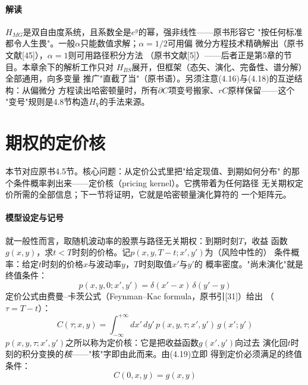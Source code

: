 \paragraph{解读}
$H_{MG}$是双自由度系统，且系数全是$e^{y}$的幂，强非线性——原书形容它
"按任何标准都令人生畏"。一般$\alpha$只能数值求解；$\alpha=1/2$可用偏
微分方程技术精确解出（原书文献[45]），$\alpha=1$则可用路径积分方法
（原书文献[5]）——后者正是第5章的节目。本章余下的解析工作只对
$H_{BS}$展开，但框架（态矢、演化、完备性、谱分解）全部通用，向多变量
推广"直截了当"（原书语）。另须注意(4.16)与(4.18)的互逆结构：从偏微分
方程读出哈密顿量时，所有$\partial C$项变号搬家、$rC$原样保留——这个
"变号"规则是4.8节构造$H_{V}$的手法来源。

\section{期权的定价核}

本节对应原书4.5节。核心问题：从定价公式里把"给定现值、到期如何分布"
的那个条件概率剥出来——定价核（pricing kernel）。它携带着为任何路径
无关期权定价所需的全部信息；下一节将证明，它就是哈密顿量演化算符的
一个矩阵元。

\paragraph{模型设定与记号}
就一般性而言，取随机波动率的股票与路径无关期权：到期时刻$T$，收益
函数$g(x,y)$，求$t<T$时刻的价格。记$p(x,y,T-t;x',y')$为（风险中性的）
条件概率：给定$t$时刻的价格$x$与波动率$y$，$T$时刻取值$x'$与$y'$的
概率密度。"尚未演化"就是终值条件：
\begin{equation*}
p(x,y,0;x',y')=\delta(x'-x)\,\delta(y'-y)
\tag{4.19}
\end{equation*}
定价公式由费曼--卡茨公式（Feynman--Kac formula，原书引[31]）给出
（$\tau=T-t$）：
\begin{equation*}
C(\tau;x,y)=\int_{-\infty}^{+\infty}dx'\,dy'\,
p(x,y,\tau;x',y')\,g(x';y')
\tag{4.20}
\end{equation*}
$p(x,y,\tau;x',y')$之所以称为定价核：它是把收益函数$g(x',y')$向过去
演化回$t$时刻的积分变换的\emph{核}——"核"字即由此而来。由(4.19)立即
得到定价必须满足的终值条件：
\begin{equation*}
C(0,x,y)=g(x,y)
\tag{4.21}
\end{equation*}

